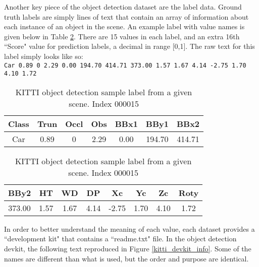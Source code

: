 Another key piece of the object detection dataset are the label data. Ground truth labels are simply lines of text that contain an array of information about each instance of an object in the scene. An example label with value names is given below in Table \ref{kitti_label_sample}. There are 15 values in each label, and an extra 16th ``Score" value for prediction labels, a decimal in range [0,1]. The raw text for this label simply looks like so: \\
\texttt{Car 0.89 0 2.29 0.00 194.70 414.71 373.00 1.57 1.67 4.14 -2.75 1.70 4.10 1.72} \\


\begin{table}[h]
\centering
\caption{KITTI object detection sample label from a given scene. Index 000015}
\begin{tabular}{|c|c|c|c|c|c|c|}
\hline
Class & Trun & Occl & Obs  & BBx1  & BBy1   & BBx2  \\
\hline
Car   & 0.89       & 0         & 2.29 & 0.00  & 194.70 & 414.71 \\
\hline
\end{tabular}
\begin{tabular}{|c|c|c|c|c|c|c|c|}
\hline
BBy2   & HT   & WD   & DP   & Xc    & Yc   & Zc   & Roty \\
\hline
373.00 & 1.57 & 1.67 & 4.14 & -2.75 & 1.70 & 4.10 & 1.72 \\
\hline
\end{tabular}
\label{kitti_label_sample}
\end{table}

In order to better understand the meaning of each value, each dataset provides a ``development kit" that contains a ``readme.txt" file. In the object detection devkit, the following text reproduced in Figure \ref{kitti_devkit_info}. Some of the names are different than what is used, but the order and purpose are identical. 


